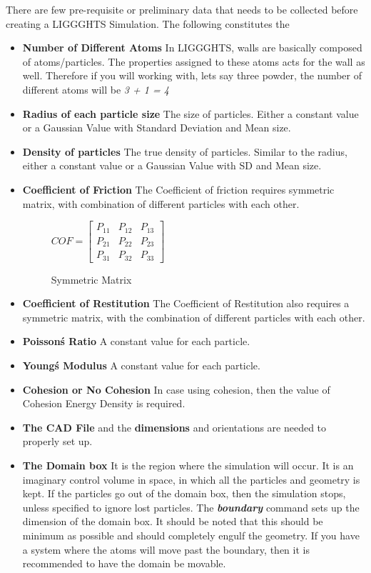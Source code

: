\documentclass{tufte-book} %
\begin{document}
There are few pre-requisite or preliminary data that needs to be collected before creating a LIGGGHTS Simulation. The following constitutes the
\begin{itemize}
\item \textbf{Number of Different Atoms}
  In LIGGGHTS, walls are basically composed of atoms/particles. The properties assigned to these atoms acts for the wall as well. Therefore if you will working with, lets say three powder, the number of different atoms will be \textit{3 + 1 = 4}
\item \textbf{Radius of each particle size} The size of particles. Either a constant value or a Gaussian Value with Standard Deviation and Mean size.
\item\textbf{ Density of particles} The true density of particles. Similar to the radius, either a constant value or a Gaussian Value with SD and Mean size.
\item \textbf{Coefficient of Friction} The Coefficient of friction requires symmetric matrix, with combination of different particles with each other.
  \begin{figure}
    \centering
    $COF =
    \begin{bmatrix}
      P_{11}&P_{12}&P_{13}\\ P_{21}&P_{22}&P_{23} \\
      P_{31}&P_{32}&P_{33}
   
    \end{bmatrix}$
     
    
    \caption{Symmetric Matrix}
    \label{fig:matrix}
  \end{figure}
\item \textbf{Coefficient of Restitution} The Coefficient of Restitution also requires a symmetric matrix, with the combination of different particles with each other.
\item \textbf{Poisson\'s Ratio} A constant value for each particle.
\item \textbf{Young\'s Modulus} A constant value for each particle.
\item \textbf{Cohesion or No Cohesion} In case using cohesion, then the value of Cohesion Energy Density is required.
\item\textbf{ The CAD File} and the\textbf{ dimensions} and orientations are needed to properly set up.
\item \textbf{The Domain box} It is the region where the simulation will occur. It is an imaginary control volume in space, in which all the particles and geometry is kept. If the particles go out of the domain box, then the simulation stops, unless specified to ignore lost particles. The \textbf{\emph{boundary}} command sets up the dimension of the domain box. It should be noted that this should be minimum as possible and should completely engulf the geometry. If you have a system where the atoms will move past the boundary, then it is recommended to have the domain be movable. 
\end{itemize}
\end{document}
